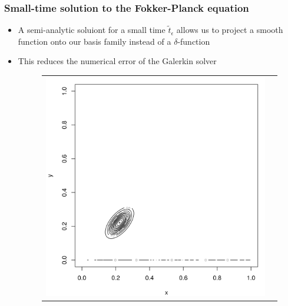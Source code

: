 \documentclass{beamer}
\begin{document}
\begin{frame}
  \frametitle{Small-time solution to the Fokker-Planck equation}
  \begin{itemize}
  \item A semi-analytic soluiont for a small time $\tilde{t}_\epsilon$ allows us to project a smooth function onto our basis family instead of a $\delta$-function
  \item This reduces the numerical error of the Galerkin solver

    \begin{figure}
  \centering
  \begin{tabular}{cc}
    \begin{minipage}{0.3\textwidth}
      \centering
      \includegraphics[width=1\linewidth]{../small-time-solution-contour.png}
    \end{minipage}
    & \begin{minipage}{0.3\textwidth}
      \centering

\end{minipage}
\end{tabular}
\end{figure}
\end{itemize}
\end{frame}
\end{document}
